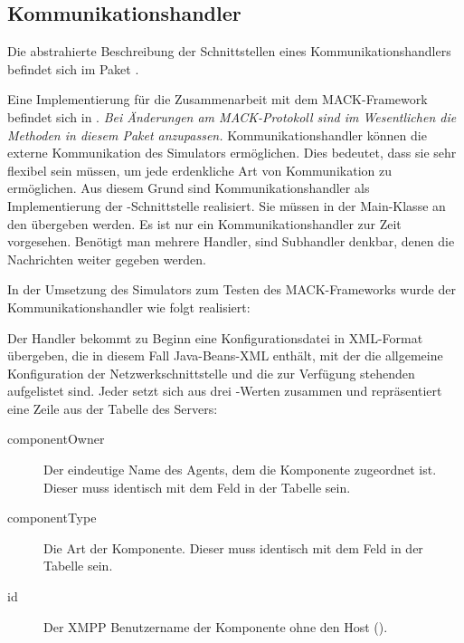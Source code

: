 \subsection{Kommunikationshandler}\label{subsec:real_communication}
Die abstrahierte Beschreibung der Schnittstellen eines Kommunikationshandlers befindet sich im Paket . 

Eine Implementierung für die Zusammenarbeit mit dem MACK-Framework befindet sich in . \emph{Bei Änderungen am MACK-Protokoll sind im Wesentlichen die Methoden in diesem Paket anzupassen.}
Kommunikationshandler können die externe Kommunikation des Simulators ermöglichen. Dies bedeutet, dass sie sehr flexibel sein müssen, um jede erdenkliche Art von Kommunikation zu ermöglichen. Aus diesem Grund sind Kommunikationshandler als Implementierung der -Schnittstelle realisiert. Sie müssen in der Main-Klasse  an den  übergeben werden. Es ist nur ein Kommunikationshandler zur Zeit vorgesehen. Benötigt man mehrere Handler, sind Subhandler denkbar, denen die Nachrichten weiter gegeben werden.

In der Umsetzung des Simulators zum Testen des MACK-Frameworks wurde der Kommunikationshandler  wie folgt realisiert:

Der Handler bekommt zu Beginn eine Konfigurationsdatei in XML-Format übergeben, die in diesem Fall Java-Beans-XML enthält, mit der die allgemeine Konfiguration der Netzwerkschnittstelle und die zur Verfügung stehenden  aufgelistet sind. Jeder  setzt sich aus drei -Werten zusammen und repräsentiert eine Zeile aus der Tabelle  des Servers:\begin{description}
	\item[componentOwner] Der eindeutige Name des Agents, dem die Komponente zugeordnet ist. Dieser  muss identisch mit dem Feld  in der Tabelle  sein.
	\item[componentType] Die Art der Komponente. Dieser  muss identisch mit dem Feld  in der Tabelle sein.
	\item[id] Der XMPP Benutzername der Komponente ohne den Host ().
\end{description}

